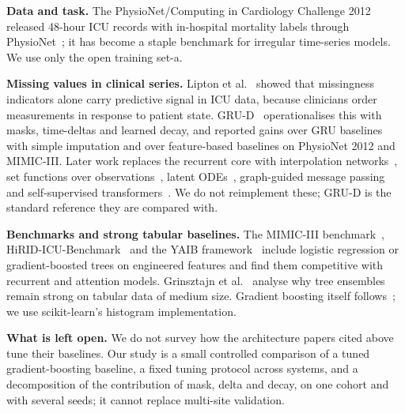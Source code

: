 \textbf{Data and task.} The PhysioNet/Computing in Cardiology Challenge 2012 released 48-hour ICU records with in-hospital mortality labels through PhysioNet~\cite{goldberger2000physiobank}; it has become a staple benchmark for irregular time-series models. We use only the open training set-a.

\textbf{Missing values in clinical series.} Lipton et al.~\cite{lipton2016modeling} showed that missingness indicators alone carry predictive signal in ICU data, because clinicians order measurements in response to patient state. GRU-D~\cite{che2016recurrent} operationalises this with masks, time-deltas and learned decay, and reported gains over GRU baselines with simple imputation and over feature-based baselines on PhysioNet 2012 and MIMIC-III. Later work replaces the recurrent core with interpolation networks~\cite{shukla2019interpolation}, set functions over observations~\cite{horn2019set}, latent ODEs~\cite{rubanova2019latent}, graph-guided message passing~\cite{zhang2021graph} and self-supervised transformers~\cite{tipirneni2021self}. We do not reimplement these; GRU-D is the standard reference they are compared with.

\textbf{Benchmarks and strong tabular baselines.} The MIMIC-III benchmark~\cite{harutyunyan2017multitask}, HiRID-ICU-Benchmark~\cite{yche2021hirid} and the YAIB framework~\cite{water2023yet} include logistic regression or gradient-boosted trees on engineered features and find them competitive with recurrent and attention models. Grinsztajn et al.~\cite{grinsztajn2022why} analyse why tree ensembles remain strong on tabular data of medium size. Gradient boosting itself follows~\cite{chen2016xgboost}; we use scikit-learn's histogram implementation.

\textbf{What is left open.} We do not survey how the architecture papers cited above tune their baselines. Our study is a small controlled comparison of a tuned gradient-boosting baseline, a fixed tuning protocol across systems, and a decomposition of the contribution of mask, delta and decay, on one cohort and with several seeds; it cannot replace multi-site validation.
